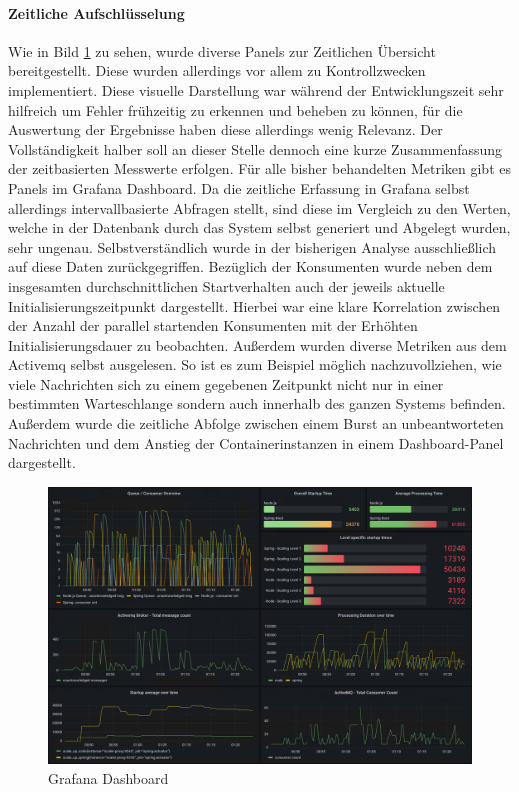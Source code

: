 \paragraph{Zeitliche Aufschlüsselung}
Wie in Bild \ref{fig:grafanaScreenshot01} zu sehen, wurde diverse Panels zur Zeitlichen Übersicht bereitgestellt. Diese wurden allerdings vor allem zu Kontrollzwecken implementiert. Diese visuelle Darstellung war während der Entwicklungszeit sehr hilfreich um Fehler frühzeitig zu erkennen und beheben zu können, für die Auswertung der Ergebnisse haben diese allerdings wenig Relevanz. Der Vollständigkeit halber soll an dieser Stelle dennoch eine kurze Zusammenfassung der zeitbasierten Messwerte erfolgen. Für alle bisher behandelten Metriken gibt es Panels im Grafana Dashboard. Da die zeitliche Erfassung in Grafana selbst allerdings intervallbasierte Abfragen stellt, sind diese im Vergleich zu den Werten, welche in der Datenbank durch das System selbst generiert und Abgelegt wurden, sehr ungenau. Selbstverständlich wurde in der bisherigen Analyse ausschließlich auf diese Daten zurückgegriffen. Bezüglich der Konsumenten wurde neben dem insgesamten durchschnittlichen Startverhalten auch der jeweils aktuelle Initialisierungszeitpunkt dargestellt. Hierbei war eine klare Korrelation zwischen der Anzahl der parallel startenden Konsumenten mit der Erhöhten Initialisierungsdauer zu beobachten. Außerdem wurden diverse Metriken aus dem Activemq selbst ausgelesen. So ist es zum Beispiel möglich nachzuvollziehen, wie viele Nachrichten sich zu einem gegebenen Zeitpunkt nicht nur in einer bestimmten Warteschlange sondern auch innerhalb des ganzen Systems befinden. Außerdem wurde die zeitliche Abfolge zwischen einem Burst an unbeantworteten Nachrichten und dem Anstieg der Containerinstanzen in einem Dashboard-Panel dargestellt.

\begin{figure}[ht!]
	\centering
	\includegraphics[width=\linewidth]{kapitel/problemloesung/implementierung/_img/grafana-dashboard-01}
	\caption[]{Grafana Dashboard}
	\label{fig:grafanaScreenshot01}
\end{figure}


